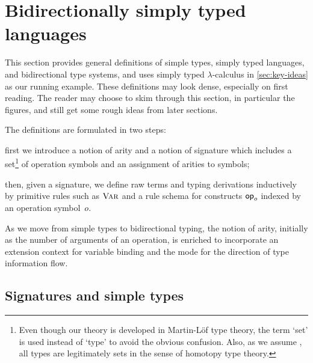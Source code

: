 
\section{Bidirectionally simply typed languages}\label{sec:defs}
This section provides general definitions
of simple types, simply typed languages, and bidirectional type systems, and uses simply typed $\lambda$-calculus in \cref{sec:key-ideas} as our running example.
These definitions may look dense, especially on first reading.
The reader may choose to skim through this section, in particular the figures, and still get some rough ideas from later sections.

The definitions are formulated in two steps:
\begin{inlineenum}
  \item first we introduce a notion of arity and a notion of signature which includes a set\footnote{%
    Even though our theory is developed in Martin-L\"of type theory, the term `set' is used instead of `type' to avoid the obvious confusion. 
    Also, as we assume \AxiomK, all types are legitimately sets in the sense of homotopy type theory.
  } of operation symbols and an assignment of arities to symbols;
\item then, given a signature, we define raw terms and typing derivations inductively by primitive rules such as $\textnormal{\textsc{Var}}$ and a rule schema for constructs $\mathsf{op}_o$ indexed by an operation symbol~$o$.
\end{inlineenum}
As we move from simple types to bidirectional typing, the notion of arity, initially as the number of arguments of an operation, is enriched to incorporate an extension context for variable binding and the mode for the direction of type information flow.

\subsection{Signatures and simple types} \label{subsec:simple-types}


